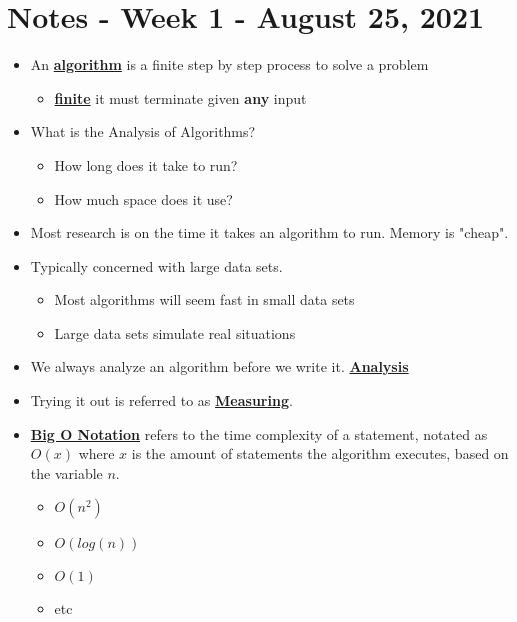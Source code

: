 \documentclass{article}
\newcommand{\definition}[1]{\underline{\textbf{#1}}}
\begin{document}
\section*{Notes - Week 1 - August 25, 2021}

\begin{itemize}

    \item An \definition{algorithm} is a finite step by step process to solve a problem
    \begin{itemize}
        \item \definition{finite} it must terminate given \textbf{any} input
    \end{itemize}

    \item What is the Analysis of Algorithms?
    \begin{itemize}
        \item How long does it take to run?
        \item How much space does it use?
    \end{itemize}

    \item Most research is on the time it takes an algorithm to run. Memory is "cheap".

    \item Typically concerned with large data sets.
    \begin{itemize}
        \item Most algorithms will seem fast in small data sets
        \item Large data sets simulate real situations
    \end{itemize}

    \item We always analyze an algorithm before we write it. \definition{Analysis}

    \item Trying it out is referred to as \definition{Measuring}.

    \item \definition{Big O Notation} refers to the time complexity of a statement, notated as $O(x)$ where $x$ is the amount of statements the algorithm executes, based on the variable $n$.
    \begin{itemize}
        \item $O(n^2)$
        \item $O(log(n))$
        \item $O(1)$
        \item etc 
    \end{itemize}

\end{itemize}
\end{document}
